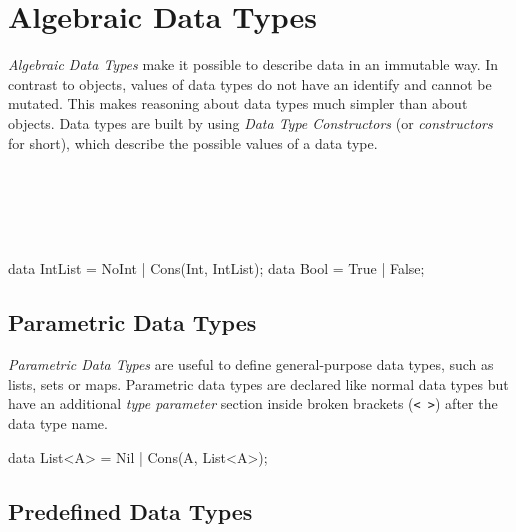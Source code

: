\chapter{Algebraic Data Types}
\label{sec:datatypes}
\emph{Algebraic Data Types} make it possible to describe data in an immutable way.
In contrast to objects, values of data types do not have an identify and cannot be mutated.
This makes reasoning about data types much simpler than about objects.
Data types are built by using \emph{Data Type Constructors} (or \emph{constructors} for short), which describe the possible values of a data type.

\begin{abssyntax}
    {}\ \ \ \ \TRS{;} \\
      \TRS{<}\ \ \ \TRS{>}\\
  {}\ \\
      {}\ 
\end{abssyntax}

\begin{absexample}
data IntList = NoInt | Cons(Int, IntList);
data Bool = True | False;
\end{absexample}

\section{Parametric Data Types}
\label{sec:parametric-datatypes}

\emph{Parametric Data Types} are useful to define general-purpose
data types, such as lists, sets or maps.  Parametric data types are
declared like normal data types but have an additional \emph{type
  parameter} section inside broken brackets (\texttt{< >}) after the
data type name.

\begin{absexample}
data List<A> = Nil | Cons(A, List<A>);
\end{absexample}

\section{Predefined Data Types}
\label{sec:predefined-datatypes}

